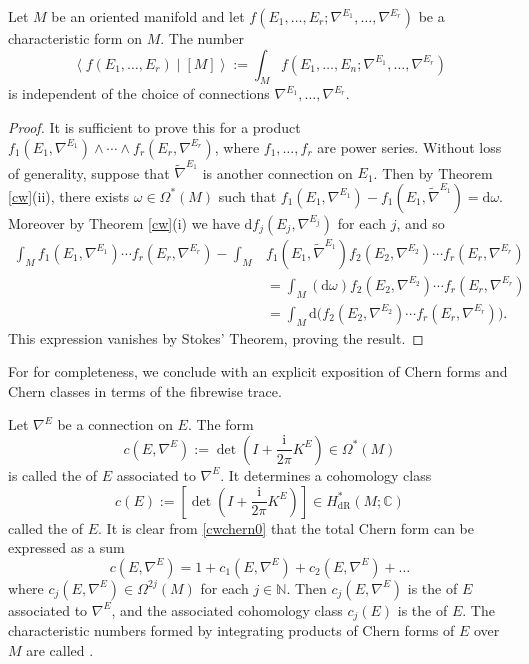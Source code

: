 \documentclass[a4paper,openany]{scrbook}
\newcommand{\ud}{\mathrm{d}}
\newcommand{\ui}{\mathrm{i}}
\begin{document}
\begin{theorem}
Let $M$ be an oriented manifold and let $f(E_1,\dots,E_r;\nabla^{E_1},\dots,\nabla^{E_r})$ be a characteristic form on $M$. The number
\begin{equation}
\left\langle f(E_1,\dots,E_r)\middle|[M]\right\rangle:=\int_Mf(E_1,\dots,E_n;\nabla^{E_1},\dots,\nabla^{E_r})
\end{equation}
is independent of the choice of connections $\nabla^{E_1},\dots,\nabla^{E_r}$.
\end{theorem}
\begin{proof}
It is sufficient to prove this for a product $f_1(E_1,\nabla^{E_1})\wedge\cdots\wedge f_r(E_r,\nabla^{E_r})$, where $f_1,\dots,f_r$ are power series. Without loss of generality, suppose that $\tilde{\nabla}^{E_1}$ is another connection on $E_1$. Then by Theorem \ref{cw}(ii), there exists $\omega\in\Omega^*(M)$ such that $f_1(E_1,\nabla^{E_1})-f_1(E_1,\tilde{\nabla}^{E_1})=\ud\omega$. Moreover by Theorem \ref{cw}(i) we have $\ud f_j(E_j,\nabla^{E_j})$ for each $j$, and so
\begin{align*}
\int_Mf_1(E_1,\nabla^{E_1})\cdots f_r(E_r,\nabla^{E_r})-\int_M&f_1(E_1,\tilde{\nabla}^{E_1})f_2(E_2,\nabla^{E_2})\cdots f_r(E_r,\nabla^{E_r})\\
&=\int_M(\ud\omega)f_2(E_2,\nabla^{E_2})\cdots f_r(E_r,\nabla^{E_r})\\
&=\int_M\ud\Big(f_2(E_2,\nabla^{E_2})\cdots f_r(E_r,\nabla^{E_r})\Big).
\end{align*}
This expression vanishes by Stokes' Theorem, proving the result.
\end{proof}


For for completeness, we conclude with an explicit exposition of Chern forms and Chern classes in terms of the fibrewise trace.

\begin{definition}
Let $\nabla^E$ be a connection on $E$. The form
\begin{equation}
c(E,\nabla^E):=\det\left(I+\frac{\ui}{2\pi}K^E\right)\in\Omega^*(M)
\end{equation}
is called the  of $E$ associated to $\nabla^E$. It determines a cohomology class
\begin{equation}
c(E):=\left[\det\left(I+\frac{\ui}{2\pi}K^E\right)\right]\in H_\text{dR}^*(M;\mathbb{C})
\end{equation}
called the  of $E$. It is clear from \eqref{cwchern0} that the total Chern form can be expressed as a sum
\begin{equation}
c(E,\nabla^E)=1+c_1(E,\nabla^E)+c_2(E,\nabla^E)+\dots
\end{equation}
where $c_j(E,\nabla^E)\in\Omega^{2j}(M)$ for each $j\in\mathbb{N}$. Then $c_j(E,\nabla^E)$ is the  of $E$ associated to $\nabla^E$, and the associated cohomology class $c_j(E)$ is the  of $E$. The characteristic numbers formed by integrating products of Chern forms of $E$ over $M$ are called .
\end{definition}
\end{document}
